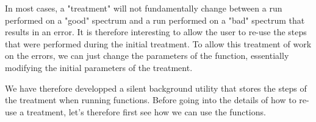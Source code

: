 In most cases, a "treatment" will not fundamentally change between a run performed on a "good" spectrum and a run performed on a "bad" spectrum that results in an error. It is therefore interesting to allow the user to re-use the steps that were performed during the initial treatment. To allow this treatment of work on the errors, we can just change the parameters of the function, essentially modifying the initial parameters of the treatment. 

We have therefore developped a silent background utility that stores the steps of the treatment when running functions. Before going into the details of how to re-use a treatment, let's therefore first see how we can use the functions.

